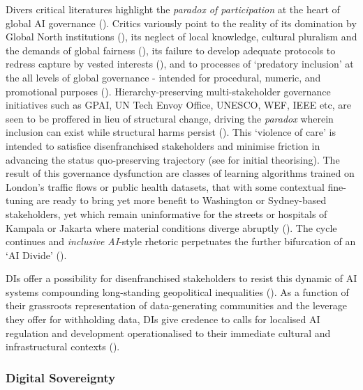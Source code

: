Divers critical literatures highlight the \textit{paradox of participation} at the heart of global AI governance (\cite{chatham_house}). Critics variously point to the reality of its domination by Global North institutions (\cite{jobin2019GlobalLandscapeAI, png2022TensionsSouthNorth}), its neglect of local knowledge, cultural pluralism and the demands of global fairness (\cite{singh2021MappingAIGlobal}), its failure to develop adequate protocols to redress capture by vested interests (\cite{ulnicane2021GoodGovernanceResponse}), and to processes of ‘predatory inclusion’ at the all levels of global governance - intended for procedural, numeric, and promotional purposes (\cite{bliss2008ParticipationInternationalDevelopment}). Hierarchy-preserving multi-stakeholder governance initiatives such as GPAI, UN Tech Envoy Office, UNESCO, WEF, IEEE etc, are seen to be proffered in lieu of structural change, driving the \textit{paradox} wherein inclusion can exist while structural harms persist (\cite{png2022TensionsSouthNorth}). This ‘violence of care’ is intended to satisfice disenfranchised stakeholders and minimise friction in advancing the status quo-preserving trajectory (see \textcite{cleaver1999ParadoxesParticipationQuestioning} for initial theorising). The result of this governance dysfunction are classes of learning algorithms trained on London’s traffic flows or public health datasets, that with some contextual fine-tuning are ready to bring yet more benefit to Washington or Sydney-based stakeholders, yet which remain uninformative for the streets or hospitals of Kampala or Jakarta where material conditions diverge abruptly  (\cite{smith2018ArtificialIntelligenceHuman}). The cycle continues and \textit{inclusive AI}-style rhetoric perpetuates the further bifurcation of an ‘AI Divide’ (\cite{lindroth2017GlobalPoliticsIts}). 

DIs offer a possibility for disenfranchised stakeholders to resist this dynamic of AI systems compounding long-standing geopolitical inequalities (\cite{couldry2020CostsConnectionHow}). As a function of their grassroots representation of data-generating communities and the leverage they offer for withholding data, DIs give credence to calls for localised AI regulation and development operationalised to their immediate cultural and infrastructural contexts (\cite{kak2020GlobalSouthEverywhere}). 

\subsubsection*{Digital Sovereignty}


